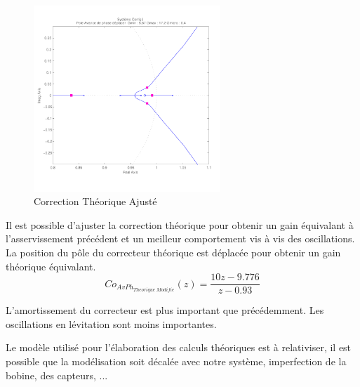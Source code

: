 \documentclass[11pt, french]{article} %
\begin{document}
\begin{figure}
	\vspace{-0.5cm}
	\includegraphics[width = 7cm,trim=0 1.4cm 0 0.7cm ,clip=true]
					{SolutionNumerique/SystemeCorrigeThoriqueAdapte.pdf}
	\caption{Correction Théorique Ajusté}
\end{figure}
Il est possible d'ajuster la correction théorique pour obtenir un gain équivalant à l'asservissement précédent et un meilleur comportement vis à vis des oscillations. La position du pôle du correcteur théorique est déplacée pour obtenir un gain théorique équivalant. 
\[  Co_{AvPh_{Theorique \; Modifie}}(z) = \dfrac {10z - 9.776} {z - 0.93} \]

L'amortissement du correcteur est plus important que précédemment. Les oscillations en lévitation sont moins importantes.

Le modèle utilisé pour l'élaboration des calculs théoriques est à relativiser, il est possible que la modélisation soit décalée avec notre système, imperfection de la bobine, des capteurs, ...

%
%
%
%
%
%
\end{document}
